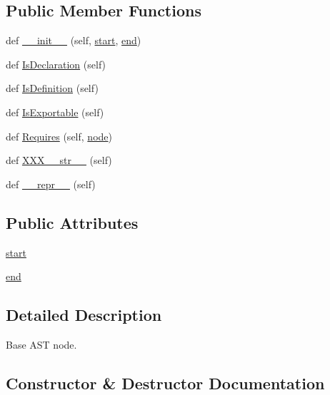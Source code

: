 \subsection*{Public Member Functions}
\begin{DoxyCompactItemize}
\item 
def \hyperlink{classcpp_1_1ast_1_1Node_a2cbd6969346645259afc3be51faae904}{\+\_\+\+\_\+init\+\_\+\+\_\+} (self, \hyperlink{classcpp_1_1ast_1_1Node_a7b2aa97e6a049bb1a93aea48c48f1f44}{start}, \hyperlink{classcpp_1_1ast_1_1Node_a3c5e5246ccf619df28eca02e29d69647}{end})
\item 
def \hyperlink{classcpp_1_1ast_1_1Node_ab3eca703a79fb65bc25dfbcb7547c79e}{Is\+Declaration} (self)
\item 
def \hyperlink{classcpp_1_1ast_1_1Node_a684ee9a357168e7e07a24fc6812f66e6}{Is\+Definition} (self)
\item 
def \hyperlink{classcpp_1_1ast_1_1Node_a313273874ccf578485006d4000128234}{Is\+Exportable} (self)
\item 
def \hyperlink{classcpp_1_1ast_1_1Node_a31ae211f954a8c578ef16226df5ac8c8}{Requires} (self, \hyperlink{classnode}{node})
\item 
def \hyperlink{classcpp_1_1ast_1_1Node_ab5dfeabcbcd7c1f5feb8522edffb8b4a}{X\+X\+X\+\_\+\+\_\+str\+\_\+\+\_\+} (self)
\item 
def \hyperlink{classcpp_1_1ast_1_1Node_ab89915656a60c7b7c752e5baa607c532}{\+\_\+\+\_\+repr\+\_\+\+\_\+} (self)
\end{DoxyCompactItemize}
\subsection*{Public Attributes}
\begin{DoxyCompactItemize}
\item 
\hyperlink{classcpp_1_1ast_1_1Node_a7b2aa97e6a049bb1a93aea48c48f1f44}{start}
\item 
\hyperlink{classcpp_1_1ast_1_1Node_a3c5e5246ccf619df28eca02e29d69647}{end}
\end{DoxyCompactItemize}


\subsection{Detailed Description}
\begin{DoxyVerb}Base AST node.\end{DoxyVerb}
 

\subsection{Constructor \& Destructor Documentation}
